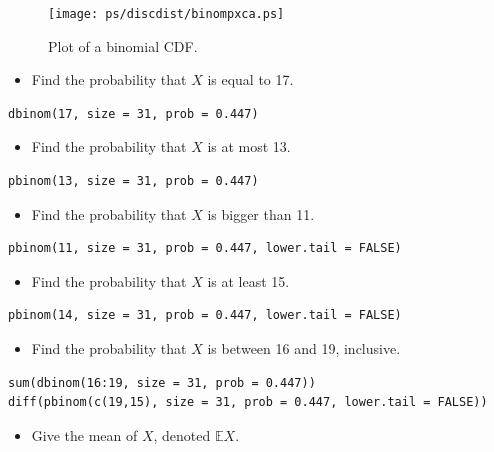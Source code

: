 \documentclass[captions=tableheading]{scrbook}
\begin{document}
\begin{xca}
  \begin{figure}[th]
    \texttt{[image: ps/discdist/binompxca.ps]}
    \caption[Plot of a binomial CDF]{\small Plot of a binomial CDF.}
    \label{fig-binompxca}
  \end{figure}


\begin{itemize}
\item Find the probability that \(X\) is equal to 17.
\end{itemize}

\begin{verbatim}
dbinom(17, size = 31, prob = 0.447)
\end{verbatim}
\begin{itemize}
\item Find the probability that \(X\) is at most 13.
\end{itemize}

\begin{verbatim}
pbinom(13, size = 31, prob = 0.447)
\end{verbatim}
\begin{itemize}
\item Find the probability that \(X\) is bigger than 11.
\end{itemize}

\begin{verbatim}
pbinom(11, size = 31, prob = 0.447, lower.tail = FALSE)
\end{verbatim}
\begin{itemize}
\item Find the probability that \(X\) is at least 15.
\end{itemize}

\begin{verbatim}
pbinom(14, size = 31, prob = 0.447, lower.tail = FALSE)
\end{verbatim}
\begin{itemize}
\item Find the probability that \(X\) is between 16 and 19, inclusive.
\end{itemize}

\begin{verbatim}
sum(dbinom(16:19, size = 31, prob = 0.447))
diff(pbinom(c(19,15), size = 31, prob = 0.447, lower.tail = FALSE))
\end{verbatim}
\begin{itemize}
\item Give the mean of \(X\), denoted \(\mathbb{E} X\).
\end{itemize}


\end{xca}
\end{document}
